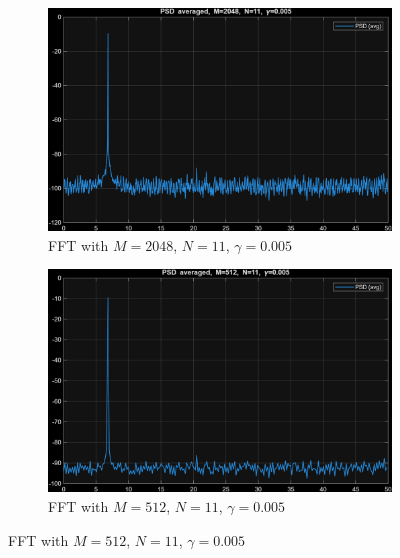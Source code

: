 \begin{figure}[H]
  \centering
  \begin{subfigure}[t]{0.45\textwidth}
    \centering
    \includegraphics[width=\linewidth,height=0.28\textheight,keepaspectratio]{img/task5_5_1.png}
    \caption{FFT with $M=2048$, $N=11$, $\gamma=0.005$}
  \end{subfigure}\hfill
  \begin{subfigure}[t]{0.45\textwidth}
    \centering
    \includegraphics[width=\linewidth,height=0.28\textheight,keepaspectratio]{img/task5_5_4.png}
    \caption{FFT with $M=512$, $N=11$, $\gamma=0.005$}
  \end{subfigure}

  \vspace{1ex}


\end{figure}
